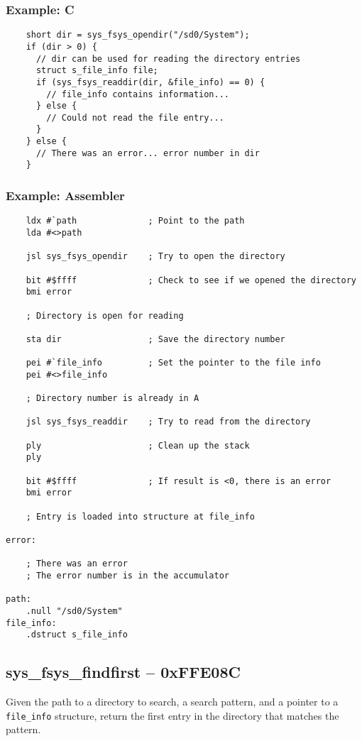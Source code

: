 \subsubsection*{Example: C}
\begin{lstlisting}
    short dir = sys_fsys_opendir("/sd0/System");
    if (dir > 0) {
      // dir can be used for reading the directory entries
      struct s_file_info file;
      if (sys_fsys_readdir(dir, &file_info) == 0) {
        // file_info contains information...
      } else {
        // Could not read the file entry...
      }
    } else {
      // There was an error... error number in dir
    }
\end{lstlisting}

\subsubsection*{Example: Assembler}
\begin{verbatim}
    ldx #`path              ; Point to the path
    lda #<>path

    jsl sys_fsys_opendir    ; Try to open the directory

    bit #$ffff              ; Check to see if we opened the directory
    bmi error

    ; Directory is open for reading

    sta dir                 ; Save the directory number

    pei #`file_info         ; Set the pointer to the file info
    pei #<>file_info

    ; Directory number is already in A

    jsl sys_fsys_readdir    ; Try to read from the directory

    ply                     ; Clean up the stack
    ply

    bit #$ffff              ; If result is <0, there is an error
    bmi error

    ; Entry is loaded into structure at file_info

error:

    ; There was an error
    ; The error number is in the accumulator

path:
    .null "/sd0/System"
file_info:
    .dstruct s_file_info
\end{verbatim}


\subsection*{sys\_fsys\_findfirst -- 0xFFE08C}
Given the path to a directory to search, a search pattern, and a pointer to a \verb+file_info+ structure,
return the first entry in the directory that matches the pattern.

